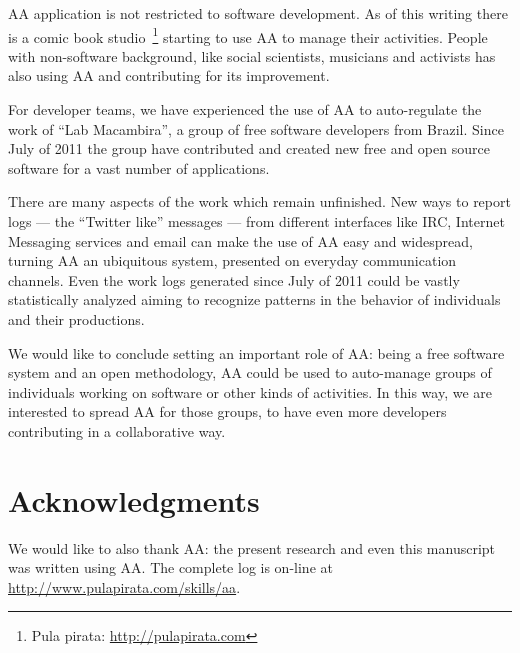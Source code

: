 \documentclass[letterpaper]{article}
\begin{document}
AA application is not restricted to software development. As of this
writing there is a comic book studio~\footnote{Pula pirata:
  \url{http://pulapirata.com}} starting to use AA to manage their
activities. People with non-software background, like social
scientists, musicians and activists has also using AA and contributing
for its improvement.

For developer teams, we have experienced the use of AA to
auto-regulate the work of ``Lab Macambira'', a group of free software
developers from Brazil. Since July of 2011 the group have contributed
and created new free and open source software for a vast number of
applications.

There are many aspects of the work which remain unfinished. New ways
to report logs --- the ``Twitter like'' messages --- from different
interfaces like IRC, Internet Messaging services and email can make
the use of AA easy and widespread, turning AA an ubiquitous system,
presented on everyday communication channels. Even the work logs
generated since July of 2011 could be vastly statistically analyzed
aiming to recognize patterns in the behavior of individuals and their
productions.

We would like to conclude setting an important role of AA: being a
free software system and an open methodology, AA could be used to
auto-manage groups of individuals working on software or other kinds
of activities. In this way, we are interested to spread AA for those
groups, to have even more developers contributing in a collaborative
way.

\section*{Acknowledgments}

We would like to also thank AA: the present research and even this
manuscript was written using AA. The complete log is on-line at
\url{http://www.pulapirata.com/skills/aa}.


\nocite{last2003}
\nocite{german2003}
\nocite{carmel1999}
\nocite{carmel2001}
\nocite{komi2005}
\nocite{battin2001}

%
%


\end{document}
